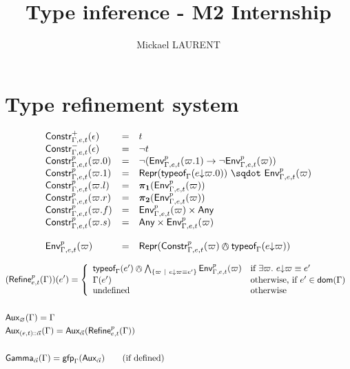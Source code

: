 \documentclass[a4paper]{article}
\title{\vspace{1.5cm}Type inference - M2 Internship}
\author{Mickael LAURENT}
\date{\vspace{-5ex}}
\theoremstyle{definition}
\begin{document}
    \maketitle

    \section{Type refinement system}

    \[
    \begin{array}{lcl}
      \typep+\epsilon{\Gamma,e,t} & = & t\\
      \typep-\epsilon{\Gamma,e,t} & = & \neg t\\
      \typep{p}{\varpi.0}{\Gamma,e,t} & = & \neg(\arrow{\Gp p{\Gamma,e,t}{(\varpi.1)}}{\neg \Gp p {\Gamma,e,t} (\varpi)})\\
      \typep{p}{\varpi.1}{\Gamma,e,t} & = & \worra{\tsrep {\tyof{\occ e{\varpi.0}}\Gamma}}{\Gp p {\Gamma,e,t} (\varpi)}\\
      \typep{p}{\varpi.l}{\Gamma,e,t} & = & \bpl{\Gp p {\Gamma,e,t} (\varpi)}\\
      \typep{p}{\varpi.r}{\Gamma,e,t} & = & \bpr{\Gp p {\Gamma,e,t} (\varpi)}\\
      \typep{p}{\varpi.f}{\Gamma,e,t} & = & \pair{\Gp p {\Gamma,e,t} (\varpi)}\Any\\
      \typep{p}{\varpi.s}{\Gamma,e,t} & = & \pair\Any{\Gp p {\Gamma,e,t} (\varpi)}\\ \\
      \Gp p {\Gamma,e,t} (\varpi) & = & \tsrep {\typep p \varpi {\Gamma,e,t} \tsand \tyof {\occ e \varpi} \Gamma}\\
    \end{array}
    \]

    \begin{align*}
      &(\Refine p {e,t} \Gamma)(e') = 
        \left\{\begin{array}{ll}
          \tyof {e'} \Gamma \tsand \bigwedge_{\{\varpi \alt \occ e \varpi \equiv e'\}} \Gp p {\Gamma,e,t} (\varpi) & \text{if } \exists \varpi.\ \occ e \varpi \equiv e' \\
          \Gamma(e') & \text{otherwise, if } e' \in \dom \Gamma\\
          \text{undefined} & \text{otherwise}
        \end{array}\right.\\&\\
      &\Gaux {\varnothing} \Gamma = \Gamma\\
      &\Gaux {\cons {(e,t)} \tenv} \Gamma = \Gaux \tenv {\Refine p {e,t} \Gamma}\\&\\
      &\Genv \tenv \Gamma=\fixpoint_\Gamma (\Gaa \tenv)\qquad \text{(if defined)}
    \end{align*}
\end{document}
